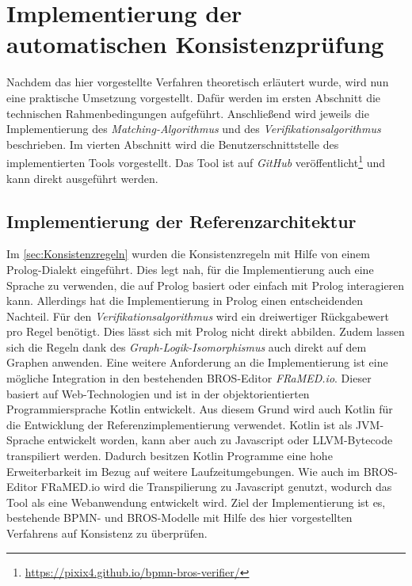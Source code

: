 \chapter{Implementierung der automatischen Konsistenzprüfung}
\label{chap:implementation}

Nachdem das hier vorgestellte Verfahren theoretisch erläutert wurde, wird nun eine praktische Umsetzung vorgestellt.
Dafür werden im ersten Abschnitt die technischen Rahmenbedingungen aufgeführt.
Anschließend wird jeweils die Implementierung des \emph{Matching-Algorithmus} und des \emph{Verifikationsalgorithmus} beschrieben.
Im vierten Abschnitt wird die Benutzerschnittstelle des implementierten Tools vorgestellt.
Das Tool ist auf \emph{GitHub} veröffentlicht\footnote{\url{https://pixix4.github.io/bpmn-bros-verifier/}} und kann direkt ausgeführt werden.

\section{Implementierung der Referenzarchitektur}

Im \cref{sec:Konsistenzregeln} wurden die Konsistenzregeln mit Hilfe von einem Prolog-Dialekt eingeführt.
Dies legt nah, für die Implementierung auch eine Sprache zu verwenden, die auf Prolog basiert oder einfach mit Prolog interagieren kann.
Allerdings hat die Implementierung in Prolog einen entscheidenden Nachteil.
Für den \emph{Verifikationsalgorithmus} wird ein dreiwertiger Rückgabewert pro Regel benötigt.
Dies lässt sich mit Prolog nicht direkt abbilden.
Zudem lassen sich die Regeln dank des \emph{Graph-Logik-Isomorphismus} auch direkt auf dem Graphen anwenden.
Eine weitere Anforderung an die Implementierung ist eine mögliche Integration in den bestehenden BROS-Editor \emph{FRaMED.io}.
Dieser basiert auf Web-Technologien und ist in der objektorientierten Programmiersprache Kotlin entwickelt.
Aus diesem Grund wird auch Kotlin für die Entwicklung der Referenzimplementierung verwendet.
Kotlin ist als JVM-Sprache entwickelt worden, kann aber auch zu Javascript oder LLVM-Bytecode transpiliert werden.
Dadurch besitzen Kotlin Programme eine hohe Erweiterbarkeit im Bezug auf weitere Laufzeitumgebungen.
Wie auch im BROS-Editor FRaMED.io wird die Transpilierung zu Javascript genutzt, wodurch das Tool als eine Webanwendung entwickelt wird.
Ziel der Implementierung ist es, bestehende BPMN- und BROS-Modelle mit Hilfe des hier vorgestellten Verfahrens auf Konsistenz zu überprüfen.

